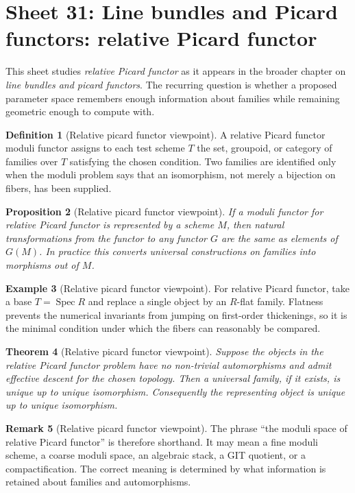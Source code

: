 \documentclass[11pt]{amsart}
\newtheorem{theorem}{Theorem}[section]
\newtheorem{proposition}[theorem]{Proposition}
\theoremstyle{definition}
\newtheorem{definition}[theorem]{Definition}
\newtheorem{example}[theorem]{Example}
\newtheorem{remark}[theorem]{Remark}
\newcommand{\Spec}{\operatorname{Spec}}
\begin{document}
\section{Sheet 31: Line bundles and Picard functors: relative Picard functor}
This sheet studies \emph{relative Picard functor} as it appears in the broader chapter on \emph{line bundles and picard functors}.  The recurring question is whether a proposed parameter space remembers enough information about families while remaining geometric enough to compute with.
\begin{definition}[Relative picard functor viewpoint]
A relative Picard functor moduli functor assigns to each test scheme $T$ the set, groupoid, or category of families over $T$ satisfying the chosen condition.  Two families are identified only when the moduli problem says that an isomorphism, not merely a bijection on fibers, has been supplied.
\end{definition}
\begin{proposition}[Relative picard functor viewpoint]
If a moduli functor for relative Picard functor is represented by a scheme $M$, then natural transformations from the functor to any functor $G$ are the same as elements of $G(M)$.  In practice this converts universal constructions on families into morphisms out of $M$.
\end{proposition}
\begin{example}[Relative picard functor viewpoint]
For relative Picard functor, take a base $T=\Spec R$ and replace a single object by an $R$-flat family.  Flatness prevents the numerical invariants from jumping on first-order thickenings, so it is the minimal condition under which the fibers can reasonably be compared.
\end{example}
\begin{theorem}[Relative picard functor viewpoint]
Suppose the objects in the relative Picard functor problem have no non-trivial automorphisms and admit effective descent for the chosen topology.  Then a universal family, if it exists, is unique up to unique isomorphism.  Consequently the representing object is unique up to unique isomorphism.
\end{theorem}
\begin{remark}[Relative picard functor viewpoint]
The phrase ``the moduli space of relative Picard functor'' is therefore shorthand.  It may mean a fine moduli scheme, a coarse moduli space, an algebraic stack, a GIT quotient, or a compactification.  The correct meaning is determined by what information is retained about families and automorphisms.
\end{remark}
\end{document}
